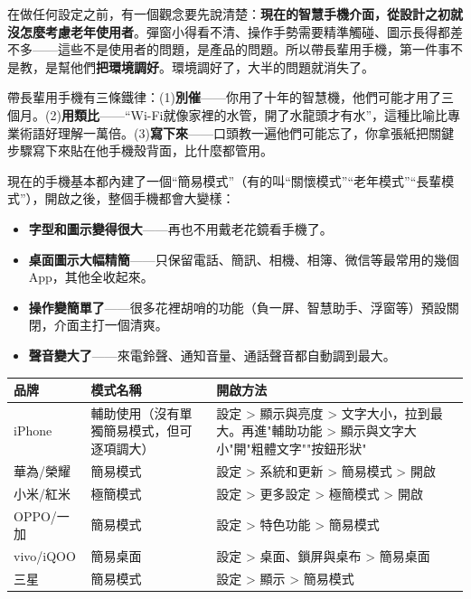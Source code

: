 


在做任何設定之前，有一個觀念要先說清楚：\textbf{現在的智慧手機介面，從設計之初就沒怎麼考慮老年使用者}。彈窗小得看不清、操作手勢需要精準觸碰、圖示長得都差不多——這些不是使用者的問題，是產品的問題。所以帶長輩用手機，第一件事不是教，是幫他們\textbf{把環境調好}。環境調好了，大半的問題就消失了。

帶長輩用手機有三條鐵律：(1)\textbf{別催}——你用了十年的智慧機，他們可能才用了三個月。(2)\textbf{用類比}——“Wi-Fi就像家裡的水管，開了水龍頭才有水”，這種比喻比專業術語好理解一萬倍。(3)\textbf{寫下來}——口頭教一遍他們可能忘了，你拿張紙把關鍵步驟寫下來貼在他手機殼背面，比什麼都管用。


現在的手機基本都內建了一個“簡易模式”（有的叫“關懷模式”“老年模式”“長輩模式”），開啟之後，整個手機都會大變樣：

\begin{itemize}
  \item \textbf{字型和圖示變得很大}——再也不用戴老花鏡看手機了。
  \item \textbf{桌面圖示大幅精簡}——只保留電話、簡訊、相機、相簿、微信等最常用的幾個App，其他全收起來。
  \item \textbf{操作變簡單了}——很多花裡胡哨的功能（負一屏、智慧助手、浮窗等）預設關閉，介面主打一個清爽。
  \item \textbf{聲音變大了}——來電鈴聲、通知音量、通話聲音都自動調到最大。
\end{itemize}


\begin{center}
\begin{tabularx}{\linewidth}{|X|X|X|}
\hline
\textbf{品牌} & \textbf{模式名稱} & \textbf{開啟方法} \tabularnewline
\hline
iPhone & 輔助使用（沒有單獨簡易模式，但可逐項調大） & 設定 > 顯示與亮度 > 文字大小，拉到最大。再進"輔助功能 > 顯示與文字大小"開"粗體文字""按鈕形狀" \tabularnewline
華為/榮耀 & 簡易模式 & 設定 > 系統和更新 > 簡易模式 > 開啟 \tabularnewline
小米/紅米 & 極簡模式 & 設定 > 更多設定 > 極簡模式 > 開啟 \tabularnewline
OPPO/一加 & 簡易模式 & 設定 > 特色功能 > 簡易模式 \tabularnewline
vivo/iQOO & 簡易桌面 & 設定 > 桌面、鎖屏與桌布 > 簡易桌面 \tabularnewline
三星 & 簡易模式 & 設定 > 顯示 > 簡易模式 \tabularnewline
\hline
\end{tabularx}
\end{center}

